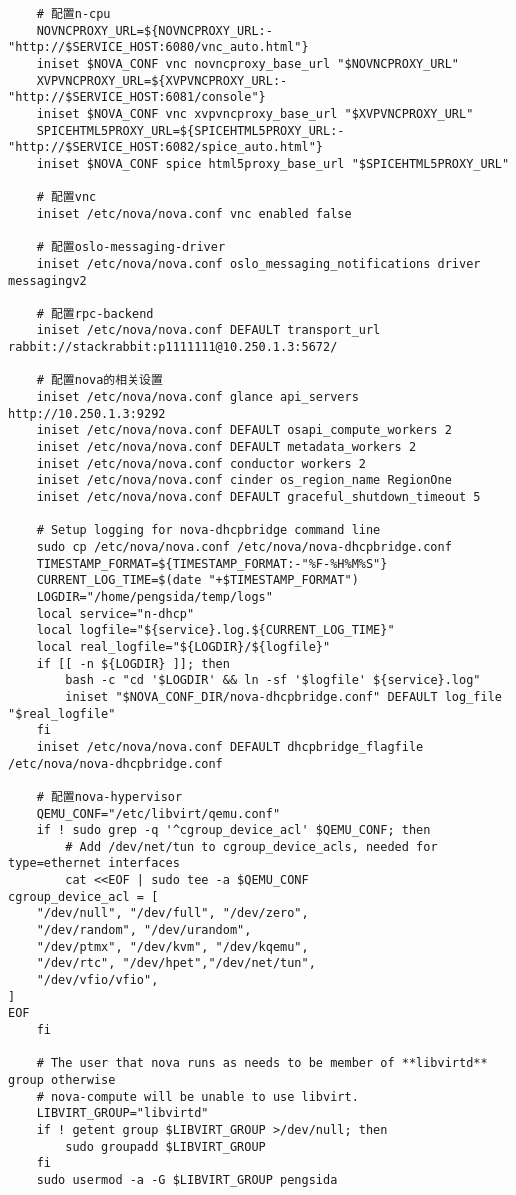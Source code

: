 \documentclass[a4paper,left=1.5cm,right=1.5cm,11pt]{article}
\begin{document}
\begin{lstlisting}
	# 配置n-cpu
	NOVNCPROXY_URL=${NOVNCPROXY_URL:-"http://$SERVICE_HOST:6080/vnc_auto.html"}
	iniset $NOVA_CONF vnc novncproxy_base_url "$NOVNCPROXY_URL"
	XVPVNCPROXY_URL=${XVPVNCPROXY_URL:-"http://$SERVICE_HOST:6081/console"}
	iniset $NOVA_CONF vnc xvpvncproxy_base_url "$XVPVNCPROXY_URL"
	SPICEHTML5PROXY_URL=${SPICEHTML5PROXY_URL:-"http://$SERVICE_HOST:6082/spice_auto.html"}
	iniset $NOVA_CONF spice html5proxy_base_url "$SPICEHTML5PROXY_URL"

	# 配置vnc
	iniset /etc/nova/nova.conf vnc enabled false

	# 配置oslo-messaging-driver
	iniset /etc/nova/nova.conf oslo_messaging_notifications driver messagingv2

	# 配置rpc-backend
	iniset /etc/nova/nova.conf DEFAULT transport_url rabbit://stackrabbit:p1111111@10.250.1.3:5672/

	# 配置nova的相关设置
	iniset /etc/nova/nova.conf glance api_servers http://10.250.1.3:9292
    iniset /etc/nova/nova.conf DEFAULT osapi_compute_workers 2
    iniset /etc/nova/nova.conf DEFAULT metadata_workers 2
    iniset /etc/nova/nova.conf conductor workers 2
    iniset /etc/nova/nova.conf cinder os_region_name RegionOne
	iniset /etc/nova/nova.conf DEFAULT graceful_shutdown_timeout 5
	 
	# Setup logging for nova-dhcpbridge command line
    sudo cp /etc/nova/nova.conf /etc/nova/nova-dhcpbridge.conf
	TIMESTAMP_FORMAT=${TIMESTAMP_FORMAT:-"%F-%H%M%S"}
	CURRENT_LOG_TIME=$(date "+$TIMESTAMP_FORMAT")
	LOGDIR="/home/pengsida/temp/logs"
	local service="n-dhcp"
    local logfile="${service}.log.${CURRENT_LOG_TIME}"
    local real_logfile="${LOGDIR}/${logfile}"
	if [[ -n ${LOGDIR} ]]; then
        bash -c "cd '$LOGDIR' && ln -sf '$logfile' ${service}.log"
        iniset "$NOVA_CONF_DIR/nova-dhcpbridge.conf" DEFAULT log_file "$real_logfile"
    fi
	iniset /etc/nova/nova.conf DEFAULT dhcpbridge_flagfile /etc/nova/nova-dhcpbridge.conf

	# 配置nova-hypervisor
	QEMU_CONF="/etc/libvirt/qemu.conf"
	if ! sudo grep -q '^cgroup_device_acl' $QEMU_CONF; then
        # Add /dev/net/tun to cgroup_device_acls, needed for type=ethernet interfaces
        cat <<EOF | sudo tee -a $QEMU_CONF
cgroup_device_acl = [
    "/dev/null", "/dev/full", "/dev/zero",
    "/dev/random", "/dev/urandom",
    "/dev/ptmx", "/dev/kvm", "/dev/kqemu",
    "/dev/rtc", "/dev/hpet","/dev/net/tun",
    "/dev/vfio/vfio",
]
EOF
    fi
	
	# The user that nova runs as needs to be member of **libvirtd** group otherwise
    # nova-compute will be unable to use libvirt.
	LIBVIRT_GROUP="libvirtd"
    if ! getent group $LIBVIRT_GROUP >/dev/null; then
        sudo groupadd $LIBVIRT_GROUP
    fi
	sudo usermod -a -G $LIBVIRT_GROUP pengsida


\end{lstlisting}
\end{document}
